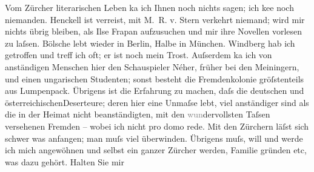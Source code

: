 \begin{ledgroupsized}[t]{13cm}
           \pstart
           Vom Zürcher literarischen Leben ka{\geminationn} ich Ihnen noch nichts sagen; ich ke{\geminationn}e noch niemanden. Henckell ist verreist, mit M. R. v.
                        Stern verkehrt niemand; wird mir nichts übrig bleiben, als Ilse Frapan aufzusuchen und mir ihre
                    Novellen vorlesen zu laſsen. Bölsche lebt
                    wieder in Berlin, Halbe in München. Windberg hab ich getroffen und treff ich
                    oft; er ist noch mein Trost. Auſserdem ka{\geminationn} ich von
                    anständigen Menschen hier den Schauspieler Néher, früher bei den Meiningern, und
                    einen ungarischen Studenten; sonst besteht die
                    Fremdenkolonie gröſstenteils aus Lumpenpack. Übrigens ist die Erfahrung zu
                    machen, daſs die deutschen und österreichischenDeserteure; deren hier eine Unmaſse
                    lebt, viel anständiger sind als die in der Heimat nicht beanständigten, mit den
                        \textcolor{gray}{wun}dervollsten Taſsen versehenen Fremden – wobei ich
                    nicht pro domo rede. Mit den Zürchern läſst
                    sich schwer was anfangen; man muſs viel überwinden. Übrigens muſs, will und
                    werde ich mich angewöhnen und selbst ein ganzer Zürcher werden, Familie gründen etc, was dazu gehört. Halten Sie mir

\end{ledgroupsized}
